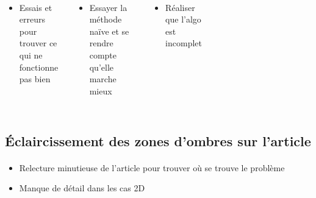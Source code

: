 \begin{frame}[fragile=singleslide]{\insertsectionhead}
  \framesubtitle{\insertsubsectionhead}
  \begin{columns}[T,onlytextwidth]
      \begin{itemize}
        \item Essais et erreurs pour trouver ce qui ne fonctionne pas bien
      \end{itemize}
      \hfill
      \begin{itemize}
        \item Essayer la méthode naïve et se rendre compte qu'elle marche mieux
      \end{itemize}
      \hfill
      \begin{itemize}
        \item Réaliser que l'algo est incomplet
      \end{itemize}
    \begin{figure}
        \begin{subfigure}{0.6\textwidth}
        \end{subfigure}
      \end{figure}
  \end{columns}
\end{frame}

\subsection{Éclaircissement des zones d'ombres sur l'article}

\begin{frame}[fragile=singleslide]{\insertsectionhead}
  \framesubtitle{\insertsubsectionhead}
  \begin{itemize}
    \item Relecture minutieuse de l'article pour trouver où se trouve le problème
  \end{itemize}
  \hfill
  \begin{itemize}
    \item Manque de détail dans les cas 2D
  \end{itemize}
\end{frame}

